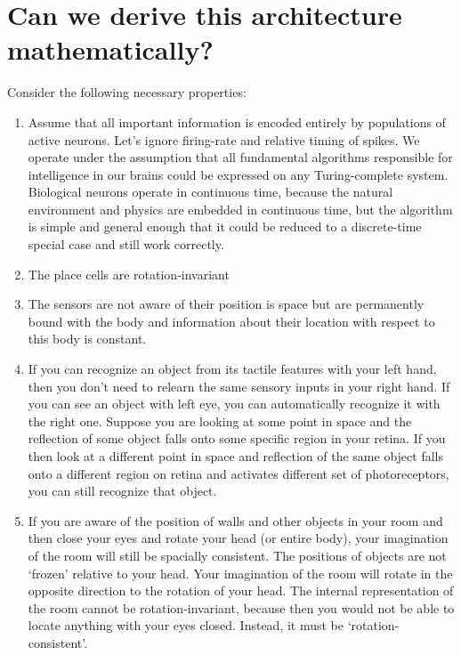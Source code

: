\documentclass[12pt]{article}
\begin{document}
\section{Can we derive this architecture mathematically?}

Consider the following necessary properties:

\begin{enumerate}
	\item \label{prop-pop} Assume that all important information is encoded entirely by populations of active neurons. Let's ignore firing-rate and relative timing of spikes. We operate under the assumption that all fundamental algorithms responsible for intelligence in our brains could be expressed on any Turing-complete system. Biological neurons operate in continuous time, because the natural environment and physics are embedded in continuous time, but the algorithm is simple and general enough that it could be reduced to a discrete-time special case and still work correctly.  
	\item \label{prop-place}  The place cells are rotation-invariant
	\item \label{prop-sense}  The sensors are not aware of their position is space but are permanently bound with the body and information about their location with respect to this body is constant.
	\item \label{prop-no-relearn} If you can recognize an object from its tactile features with your left hand, then you don't need to relearn the same sensory inputs in your right hand. If you can see an object with left eye, you can automatically recognize it with the right one. Suppose you are looking at some point in space and the reflection of some object falls onto some specific region in your retina. If you then look at a different point in space and reflection of the same object falls onto a different region on retina and activates different set of photoreceptors, you can still recognize that object.
	\item \label{prop-rot}  If you are aware of the position of walls and other objects in your room and then close your eyes and rotate your head (or entire body), your imagination of the room will still be spacially consistent. The positions of objects are not `frozen'  relative to your head. Your imagination of the room will rotate in the opposite direction to the rotation of your head. The internal representation of the room cannot be rotation-invariant, because then you would not be able to locate anything with your eyes closed. Instead, it must be `rotation-consistent'.
\end{enumerate}
\end{document}
